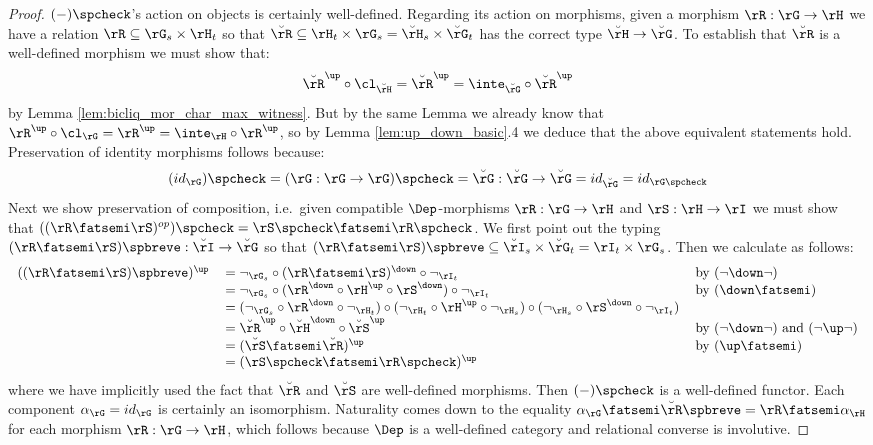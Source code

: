 \documentclass{article}
\begin{document}
\begin{proof}
$(-)\spcheck$'s action on objects is certainly well-defined. Regarding its action on morphisms, given a morphism $\rR : \rG \to \rH$ we have a relation $\rR \subseteq \rG_s \times \rH_t$ so that $\breve{\rR} \subseteq \rH_t \times \rG_s = \breve{\rH}_s \times \breve{\rG}_t$ has the correct type $\breve{\rH} \to \breve{\rG}$. To establish that $\breve{\rR}$ is a well-defined morphism we must show that:
\[
\breve{\rR}^\up \circ \cl_{\breve{\rH}} = \breve{\rR}^\up = \inte_{\breve{\rG}} \circ \breve{\rR}^\up
\]
by Lemma \ref{lem:bicliq_mor_char_max_witness}. But by the same Lemma we already know that $\rR^\up \circ \cl_\rG = \rR^\up = \inte_\rH \circ \rR^\up$, so by Lemma \ref{lem:up_down_basic}.4 we deduce that the above equivalent statements hold. Preservation of identity morphisms follows because: 
\[
(id_\rG)\spcheck 
= (\rG : \rG \to \rG)\spcheck = \breve{\rG} : \breve{\rG} \to \breve{\rG} = id_{\breve{\rG}} = id_{\rG\spcheck}
\]
Next we show preservation of composition, i.e.\ given compatible $\Dep$-morphisms $\rR : \rG \to \rH$ and $\rS : \rH \to \rI$ we must show that $((\rR \fatsemi \rS)^{op})\spcheck = \rS\spcheck \fatsemi \rR\spcheck$. We first point out the typing $(\rR \fatsemi \rS)\spbreve : \breve{\rI} \to \breve{\rG}$ so that $(\rR \fatsemi \rS)\spbreve \subseteq \breve{\rI}_s \times \breve{\rG}_t = \rI_t \times \rG_s$. Then we calculate as follows:
\[
\begin{tabular}{lll}
$((\rR\fatsemi\rS)\spbreve)^\up$
&
$= \neg_{\rG_s} \circ (\rR\fatsemi\rS)^\down \circ \neg_{\rI_t}$
& by $(\neg\down\neg)$
\\&
$= \neg_{\rG_s} \circ (\rR^\down \circ \rH^\up \circ \rS^\down) \circ \neg_{\rI_t}$
& by $(\down\fatsemi)$
\\&
$= (\neg_{\rG_s} \circ \rR^\down \circ \neg_{\rH_t}) \circ (\neg_{\rH_t} \circ \rH^\up \circ \neg_{\rH_s}) \circ (\neg_{\rH_s} \circ \rS^\down \circ \neg_{\rI_t})$
\\&
$= \breve{\rR}^\up \circ \breve{\rH}^\down \circ \breve{\rS}^\up$
& by $(\neg\down\neg)$ and $(\neg\up\neg)$
\\&
$= (\breve{\rS} \fatsemi \breve{\rR})^\up$
& by $(\up\fatsemi)$
\\&
$= (\rS\spcheck \fatsemi \rR\spcheck)^\up$
\end{tabular}
\]
where we have implicitly used the fact that $\breve{\rR}$ and $\breve{\rS}$ are well-defined morphisms. Then $(-)\spcheck$ is a well-defined functor. Each component $\alpha_\rG = id_\rG$ is certainly an isomorphism. Naturality comes down to the equality $\alpha_\rG \fatsemi \breve{\rR}\spbreve = \rR \fatsemi \alpha_\rH$ for each morphism $\rR : \rG \to \rH$, which follows because $\Dep$ is a well-defined category and relational converse is involutive.


\end{proof}
\end{document}
